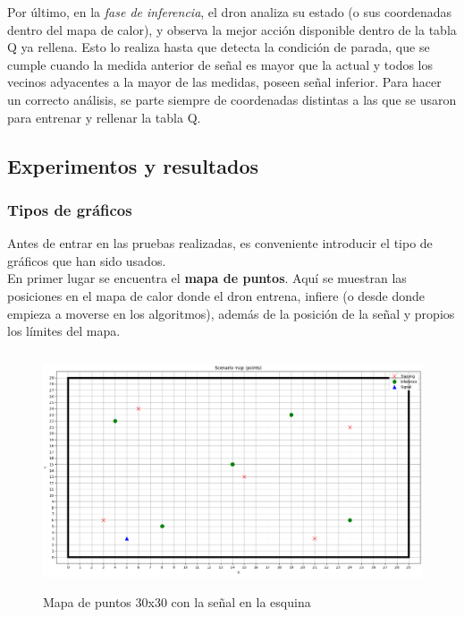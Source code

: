 Por último, en la \emph{fase de inferencia}, el dron analiza su estado (o sus coordenadas dentro del mapa de calor), y observa la mejor acción disponible dentro de la tabla Q ya rellena. Esto lo realiza hasta que detecta la condición de parada, que se cumple cuando la medida anterior de señal es mayor que la actual y todos los vecinos adyacentes a la mayor de las medidas, poseen señal inferior. Para hacer un correcto análisis, se parte siempre de coordenadas distintas a las que se usaron para entrenar y rellenar la tabla Q.

\subsection{Experimentos y resultados}
\label{subsec:experimentos_sf}

\subsubsection{Tipos de gráficos}
\label{subsubsec:graficos}

Antes de entrar en las pruebas realizadas, es conveniente introducir el tipo de gráficos que han sido usados.\\

En primer lugar se encuentra el \textbf{mapa de puntos}. Aquí se muestran las posiciones en el mapa de calor donde el dron entrena, infiere (o desde donde empieza a moverse en los algoritmos), además de la posición de la señal y propios los límites del mapa.\\

\begin{figure} [H]
    \begin{center}
    \includegraphics[height=7cm]{imagenes/cap4/12_puntos_30_esquina.png}
    \end{center}
    \caption[Mapa de puntos 30x30 con la señal en la esquina]{Mapa de puntos 30x30 con la señal en la esquina}
    \label{fig:30_points}
\end{figure}

